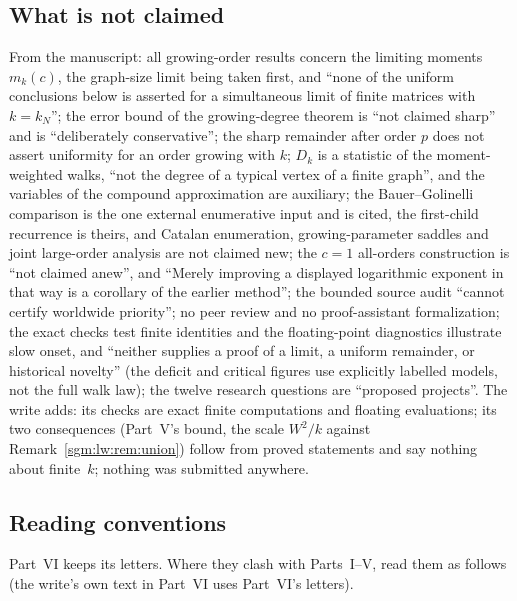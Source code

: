 \documentclass[11pt,letterpaper]{article}
\theoremstyle{remark}\newtheorem{remark}[theorem]{Remark}
\theoremstyle{definition}\newtheorem{definition}[theorem]{Definition}
\begin{document}
\subsection{What is not claimed}\label{sgm:md:sec:nonclaims}

From the manuscript: all growing-order results concern the limiting moments
$m_k(c)$, the graph-size limit being taken first, and ``none of the uniform
conclusions below is asserted for a simultaneous limit of finite matrices
with $k=k_N$''; the error bound of the growing-degree theorem is ``not
claimed sharp'' and is ``deliberately conservative''; the sharp remainder
after order $p$ does not assert uniformity for an order growing with $k$;
$D_k$ is a statistic of the moment-weighted walks, ``not the degree of a
typical vertex of a finite graph'', and the variables of the compound
approximation are auxiliary; the Bauer--Golinelli comparison is the one
external enumerative input and is cited, the first-child recurrence is
theirs, and Catalan enumeration, growing-parameter saddles and joint
large-order analysis are not claimed new; the $c=1$ all-orders construction
is ``not claimed anew'', and ``Merely improving a displayed logarithmic
exponent in that way is a corollary of the earlier method''; the bounded
source audit ``cannot certify worldwide priority''; no peer review and no
proof-assistant formalization; the exact checks test finite identities and the
floating-point diagnostics illustrate slow onset, and ``neither supplies a
proof of a limit, a uniform remainder, or historical novelty'' (the deficit
and critical figures use explicitly labelled models, not the full walk law);
the twelve research questions are ``proposed projects''. The write adds: its
checks are exact finite computations and floating evaluations; its two
consequences (Part~V's bound, the scale $W^2/k$ against
Remark~\ref{sgm:lw:rem:union}) follow from proved statements and say nothing
about finite~$k$; nothing was submitted anywhere.

\subsection{Reading conventions}\label{sgm:md:sec:notation}

Part~VI keeps its letters. Where they clash with Parts~I--V, read them as
follows (the write's own text in Part~VI uses Part~VI's letters).
\end{document}
